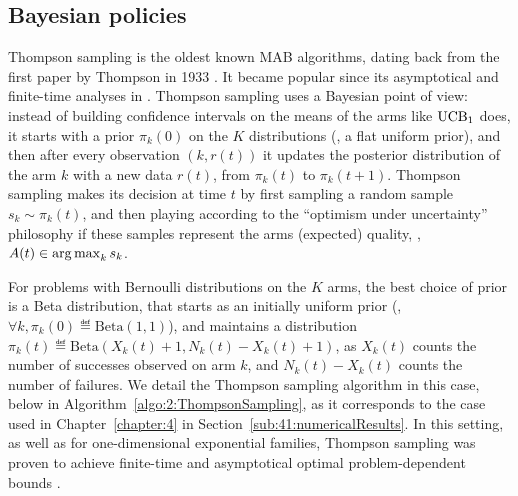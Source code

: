 

\subsection{Bayesian policies}
\label{sub:2:BayesianPolicies}



Thompson sampling is the oldest known MAB algorithms, dating back from the first paper by Thompson in 1933 \cite{Thompson33}.
It became popular since its asymptotical and finite-time analyses in \cite{AgrawalGoyal11,Kaufmann12Thompson}.
%
Thompson sampling uses a Bayesian point of view:
instead of building confidence intervals on the means of the arms like $\mathrm{UCB}_1$ does,
it starts with a prior $\pi_k(0)$ on the $K$ distributions (\eg, a flat uniform prior), and then after every observation $(k, r(t))$ it updates the posterior distribution of the arm $k$ with a new data $r(t)$, from $\pi_k(t)$ to $\pi_k(t+1)$.
Thompson sampling makes its decision at time $t$ by first sampling a random sample $s_k \sim \pi_k(t)$, and then playing according to the ``optimism under uncertainty'' philosophy if these samples represent the arms (expected) quality, \ie, $A(t) \in \operatorname*{arg\,max}_k s_k$.

For problems with Bernoulli distributions on the $K$ arms,
the best choice of prior is a Beta distribution, that starts as an initially uniform prior (\ie, $\forall k, \pi_k(0) \eqdef \mathrm{Beta}(1,1)$),
and maintains a distribution $\pi_k(t) \eqdef \mathrm{Beta}(X_k(t)+1,N_k(t)-X_k(t)+1)$,
as $X_k(t)$ counts the number of successes observed on arm $k$, and $N_k(t)-X_k(t)$ counts the number of failures.
%
We detail the Thompson sampling algorithm in this case, below in Algorithm~\ref{algo:2:ThompsonSampling}, as it corresponds to the case used in Chapter~\ref{chapter:4} in Section~\ref{sub:41:numericalResults}.
%
In this setting, as well as for one-dimensional exponential families,
Thompson sampling was proven to achieve finite-time and asymptotical optimal problem-dependent bounds \cite{Kaufmann12Thompson,AgrawalGoyal11}.


